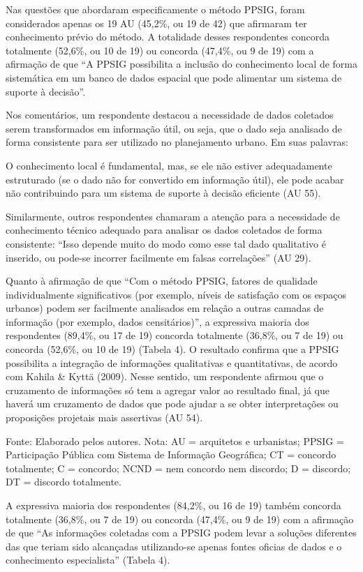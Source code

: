 \documentclass{article}
\begin{document}
\begin{multicols}{2}
Nas questões que abordaram especificamente o método PPSIG, foram considerados
apenas os 19 AU (45,2\%, ou 19 de 42) que afirmaram ter conhecimento prévio do
método. A totalidade desses respondentes concorda totalmente (52,6\%, ou 10 de
19) ou concorda (47,4\%, ou 9 de 19) com a afirmação de que “A PPSIG
possibilita a inclusão do conhecimento local de forma sistemática em um
banco de dados espacial que pode alimentar um sistema de suporte à
decisão”.

Nos comentários, um respondente destacou a necessidade de dados coletados serem
transformados em informação útil, ou seja, que o dado seja analisado de forma
consistente para ser utilizado no planejamento urbano. Em suas palavras:

O conhecimento local é fundamental, mas, se ele não estiver adequadamente
estruturado (se o dado não for convertido em informação útil), ele pode
acabar não contribuindo para um sistema de suporte à decisão eficiente
(AU 55).

Similarmente, outros respondentes chamaram a atenção para a necessidade de
conhecimento técnico adequado para analisar os dados coletados de forma
consistente: “Isso depende muito do modo como esse tal dado qualitativo
é inserido, ou pode-se incorrer facilmente em falsas correlações”
(AU 29).

Quanto à afirmação de que “Com o método PPSIG, fatores de qualidade
individualmente significativos (por exemplo, níveis de satisfação com os
espaços urbanos) podem ser facilmente analisados em relação a outras camadas
de informação (por exemplo, dados censitários)”, a expressiva
maioria dos respondentes (89,4\%, ou 17 de 19) concorda totalmente (36,8\%, ou 7
de 19) ou concorda (52,6\%, ou 10 de 19) (Tabela
4). O resultado confirma que a PPSIG possibilita a integração de
informações qualitativas e quantitativas, de acordo com Kahila \& Kyttä (2009).
Nesse sentido, um respondente
afirmou que o cruzamento de informações só tem a agregar valor ao resultado
final, já que haverá um cruzamento de dados que pode ajudar a se obter
interpretações ou proposições projetais mais assertivas (AU 54).

Fonte: Elaborado pelos autores. Nota: AU = arquitetos e urbanistas;
PPSIG = Participação Pública com Sistema de Informação Geográfica;
CT = concordo totalmente; C = concordo; NCND = nem concordo nem
discordo; D = discordo; DT = discordo totalmente.

A expressiva maioria dos respondentes (84,2\%, ou 16 de 19) também concorda
totalmente (36,8\%, ou 7 de 19) ou concorda (47,4\%, ou 9 de 19) com a afirmação
de que “As informações coletadas com a PPSIG podem levar a soluções
diferentes das que teriam sido alcançadas utilizando-se apenas fontes
oficias de dados e o conhecimento especialista” (Tabela 4).


\end{multicols}
\end{document}
